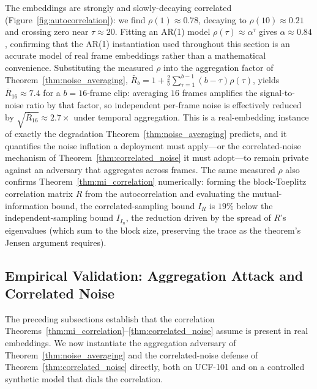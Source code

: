 \documentclass[letterpaper]{article} %
\begin{document}
The embeddings are strongly and slowly-decaying correlated
(Figure~\ref{fig:autocorrelation}): we find $\rho(1) \approx 0.78$,
decaying to $\rho(10) \approx 0.21$ and crossing zero near
$\tau \approx 20$. Fitting an AR(1) model $\rho(\tau) \approx \alpha^\tau$
gives $\alpha \approx 0.84$, confirming that the AR(1) instantiation used
throughout this section is an accurate model of real frame embeddings
rather than a mathematical convenience. Substituting the measured $\rho$
into the aggregation factor of Theorem~\ref{thm:noise_averaging},
$\bar{R}_b = 1 + \frac{2}{b}\sum_{\tau=1}^{b-1}(b-\tau)\rho(\tau)$, yields
$\bar{R}_{16} \approx 7.4$ for a $b=16$-frame clip: averaging $16$ frames
amplifies the signal-to-noise ratio by that factor, so independent
per-frame noise is effectively reduced by
$\sqrt{\bar{R}_{16}} \approx 2.7\times$ under temporal aggregation. This
is a real-embedding instance of exactly the degradation
Theorem~\ref{thm:noise_averaging} predicts, and it quantifies the noise
inflation a deployment must apply---or the correlated-noise mechanism of
Theorem~\ref{thm:correlated_noise} it must adopt---to remain private
against an adversary that aggregates across frames. The same measured
$\rho$ also confirms Theorem~\ref{thm:mi_correlation} numerically: forming
the block-Toeplitz correlation matrix $R$ from the autocorrelation and
evaluating the mutual-information bound, the correlated-sampling bound
$I_R$ is $19\%$ below the independent-sampling bound $I_{I_n}$, the
reduction driven by the spread of $R$'s eigenvalues (which sum to the
block size, preserving the trace as the theorem's Jensen argument
requires).

\subsection{Empirical Validation: Aggregation Attack and Correlated Noise}
\label{subsec:corr_empirical}

The preceding subsections establish that the correlation
Theorems~\ref{thm:mi_correlation}--\ref{thm:correlated_noise} assume is
present in real embeddings. We now instantiate the aggregation adversary
of Theorem~\ref{thm:noise_averaging} and the correlated-noise defense of
Theorem~\ref{thm:correlated_noise} directly, both on UCF-101 and on a
controlled synthetic model that dials the correlation.
\end{document}
